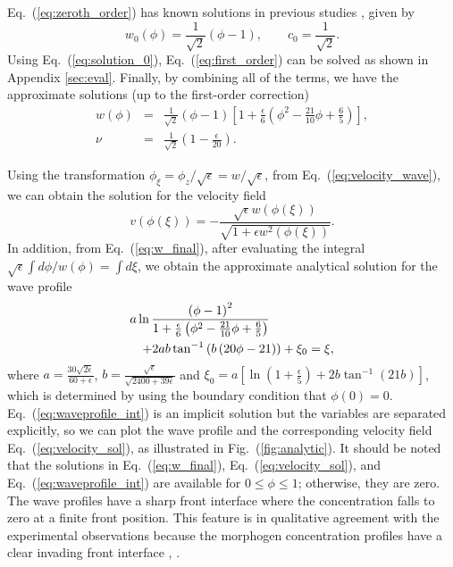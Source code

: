\documentclass[jkps,preprint,fleqn,showpacs,showkeys]{revtex4}
\newcommand{\Fig}[1]{Fig.~(\ref{#1})}
\newcommand{\eq}[1]{Eq.~(\ref{#1})}
\begin{document}
\eq{eq:zeroth_order} has known solutions in previous studies \cite{Newman1980}, \cite{Murray1989} given by 
\begin{equation}\label{eq:solution_0}
w_0(\phi) = \frac{1}{\sqrt 2}\left(\phi-1\right), \qquad c_0 = \frac{1}{\sqrt 2}.
\end{equation}
Using \eq{eq:solution_0}, \eq{eq:first_order} can be solved as shown in Appendix \ref{sec:eval}. Finally, by combining all of the terms, we have the approximate solutions (up to the first-order correction)
\begin{eqnarray}
\label{eq:w_final}
w(\phi) &=& \frac{1}{\sqrt 2}\left(\phi-1\right)\left[1+\frac{\epsilon}{6}\left(\phi^2-\frac{21}{10}\phi+\frac{6}{5}\right)\right], \\
\label{eq:c_final}
\nu &=& \frac{1}{\sqrt 2}\left(1-\frac{\epsilon}{20}\right).
\end{eqnarray}

Using the transformation $\phi_\xi = \phi_z/\sqrt{\epsilon} = w/\sqrt{\epsilon}$, from \eq{eq:velocity_wave}, we can obtain the solution for the velocity field 
\begin{equation}\label{eq:velocity_sol}
v(\phi(\xi)) = -\frac{\sqrt\epsilon w(\phi(\xi))}{\sqrt{1+\epsilon w^2(\phi(\xi))}}.
\end{equation}
In addition, from \eq{eq:w_final}, after evaluating the integral $\sqrt{\epsilon}\int d\phi/w(\phi) = \int d\xi$, we obtain the approximate analytical solution for the wave profile
\begin{eqnarray}\label{eq:waveprofile_int}
\lefteqn{
a \ln \frac{\left(\phi-1\right)^2}{1+\frac{\epsilon}{6}\left(\phi^2-\frac{21}{10}\phi+\frac{6}{5}\right)}
}\nonumber\\ 
&& + 2ab \tan^{-1} \left(b\left(20\phi-21\right)\right) + \xi_0 = \xi,
\end{eqnarray}
where $a = \frac{30\sqrt{2\epsilon}}{60+\epsilon}$, $b = \frac{\sqrt{\epsilon}}{\sqrt{2400+39\epsilon}}$ and $\xi_0 = a\left[\ln\left(1+\frac{\epsilon}{5}\right) + 2b\tan^{-1}(21b)\right]$, which is determined by using the boundary condition that $\phi(0)=0$. \eq{eq:waveprofile_int} is an implicit solution but the variables are separated explicitly, so we can plot the wave profile and the corresponding velocity field \eq{eq:velocity_sol}, as illustrated in \Fig{fig:analytic}. It should be noted that the solutions in \eq{eq:w_final}, \eq{eq:velocity_sol}, and \eq{eq:waveprofile_int} are available for $0 \leq \phi \leq 1$; otherwise, they are zero. The wave profiles have a sharp front interface where the concentration falls to zero at a finite front position. This feature is in qualitative agreement with the experimental observations because the morphogen concentration profiles have a clear invading front interface \cite{Verbeni2013morphogenetic}, \cite{Sanchez2015modeling}. 
\end{document}
